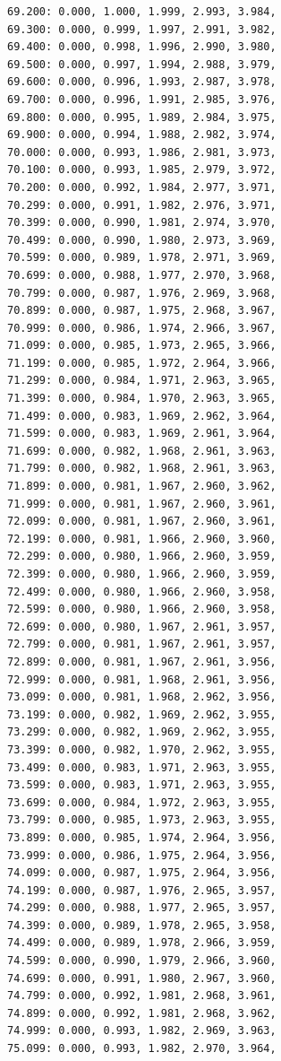 \documentclass[12pt, a4paper]{article}
\begin{document}
\begin{scriptsize}
\begin{ttfamily}
\begin{lstlisting}
69.200: 0.000, 1.000, 1.999, 2.993, 3.984, 
69.300: 0.000, 0.999, 1.997, 2.991, 3.982, 
69.400: 0.000, 0.998, 1.996, 2.990, 3.980, 
69.500: 0.000, 0.997, 1.994, 2.988, 3.979, 
69.600: 0.000, 0.996, 1.993, 2.987, 3.978, 
69.700: 0.000, 0.996, 1.991, 2.985, 3.976, 
69.800: 0.000, 0.995, 1.989, 2.984, 3.975, 
69.900: 0.000, 0.994, 1.988, 2.982, 3.974, 
70.000: 0.000, 0.993, 1.986, 2.981, 3.973, 
70.100: 0.000, 0.993, 1.985, 2.979, 3.972, 
70.200: 0.000, 0.992, 1.984, 2.977, 3.971, 
70.299: 0.000, 0.991, 1.982, 2.976, 3.971, 
70.399: 0.000, 0.990, 1.981, 2.974, 3.970, 
70.499: 0.000, 0.990, 1.980, 2.973, 3.969, 
70.599: 0.000, 0.989, 1.978, 2.971, 3.969, 
70.699: 0.000, 0.988, 1.977, 2.970, 3.968, 
70.799: 0.000, 0.987, 1.976, 2.969, 3.968, 
70.899: 0.000, 0.987, 1.975, 2.968, 3.967, 
70.999: 0.000, 0.986, 1.974, 2.966, 3.967, 
71.099: 0.000, 0.985, 1.973, 2.965, 3.966, 
71.199: 0.000, 0.985, 1.972, 2.964, 3.966, 
71.299: 0.000, 0.984, 1.971, 2.963, 3.965, 
71.399: 0.000, 0.984, 1.970, 2.963, 3.965, 
71.499: 0.000, 0.983, 1.969, 2.962, 3.964, 
71.599: 0.000, 0.983, 1.969, 2.961, 3.964, 
71.699: 0.000, 0.982, 1.968, 2.961, 3.963, 
71.799: 0.000, 0.982, 1.968, 2.961, 3.963, 
71.899: 0.000, 0.981, 1.967, 2.960, 3.962, 
71.999: 0.000, 0.981, 1.967, 2.960, 3.961, 
72.099: 0.000, 0.981, 1.967, 2.960, 3.961, 
72.199: 0.000, 0.981, 1.966, 2.960, 3.960, 
72.299: 0.000, 0.980, 1.966, 2.960, 3.959, 
72.399: 0.000, 0.980, 1.966, 2.960, 3.959, 
72.499: 0.000, 0.980, 1.966, 2.960, 3.958, 
72.599: 0.000, 0.980, 1.966, 2.960, 3.958, 
72.699: 0.000, 0.980, 1.967, 2.961, 3.957, 
72.799: 0.000, 0.981, 1.967, 2.961, 3.957, 
72.899: 0.000, 0.981, 1.967, 2.961, 3.956, 
72.999: 0.000, 0.981, 1.968, 2.961, 3.956, 
73.099: 0.000, 0.981, 1.968, 2.962, 3.956, 
73.199: 0.000, 0.982, 1.969, 2.962, 3.955, 
73.299: 0.000, 0.982, 1.969, 2.962, 3.955, 
73.399: 0.000, 0.982, 1.970, 2.962, 3.955, 
73.499: 0.000, 0.983, 1.971, 2.963, 3.955, 
73.599: 0.000, 0.983, 1.971, 2.963, 3.955, 
73.699: 0.000, 0.984, 1.972, 2.963, 3.955, 
73.799: 0.000, 0.985, 1.973, 2.963, 3.955, 
73.899: 0.000, 0.985, 1.974, 2.964, 3.956, 
73.999: 0.000, 0.986, 1.975, 2.964, 3.956, 
74.099: 0.000, 0.987, 1.975, 2.964, 3.956, 
74.199: 0.000, 0.987, 1.976, 2.965, 3.957, 
74.299: 0.000, 0.988, 1.977, 2.965, 3.957, 
74.399: 0.000, 0.989, 1.978, 2.965, 3.958, 
74.499: 0.000, 0.989, 1.978, 2.966, 3.959, 
74.599: 0.000, 0.990, 1.979, 2.966, 3.960, 
74.699: 0.000, 0.991, 1.980, 2.967, 3.960, 
74.799: 0.000, 0.992, 1.981, 2.968, 3.961, 
74.899: 0.000, 0.992, 1.981, 2.968, 3.962, 
74.999: 0.000, 0.993, 1.982, 2.969, 3.963, 
75.099: 0.000, 0.993, 1.982, 2.970, 3.964, 

\end{lstlisting}
\end{ttfamily}
\end{scriptsize}
\end{document}
